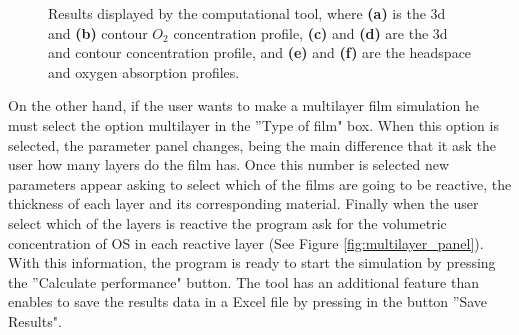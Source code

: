 \begin{refsection}
\begin{figure}[ht]
            \caption{Results displayed by the computational tool, where \textbf{(a)} is the 3d and  \textbf{(b)} contour $O_2$ concentration profile, \textbf{(c)} and \textbf{(d)} are the 3d and contour  concentration profile, and  \textbf{(e)} and \textbf{(f)} are the headspace and oxygen absorption profiles.}
            \label{fig:resultados herramienta}
    \end{figure}
On the other hand, if the user wants to make a multilayer film simulation he must select the option multilayer in the ''Type of film" box. When this option is selected, the parameter panel changes, being the main difference that it ask the user how many layers do the film has. Once this number is selected new parameters appear asking to select which of the films are going to be reactive, the thickness of each layer and its corresponding material. Finally when the user select which of the layers is reactive the program ask for the volumetric concentration of OS in each reactive layer (See Figure \ref{fig:multilayer_panel}). With this information, the program is ready to start the simulation by pressing the ''Calculate performance" button. The tool has an additional feature than enables to save the results data in a Excel file by pressing in the button ''Save Results". 


\end{refsection}
